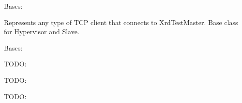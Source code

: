 \documentclass[a4paper,11pt,openany]{sphinxmanual}
\begin{document}
\begin{fulllineitems}
\label{ref-manual/XrdTest:XrdTest.TCPClient.TCPClient}
Bases: {\hyperref[ref-manual/XrdTest:XrdTest.Utils.Stateful]{}}

Represents any type of TCP client that connects to XrdTestMaster. Base
class for Hypervisor and Slave.

\begin{fulllineitems}
\label{ref-manual/XrdTest:XrdTest.TCPClient.TCPClient.S_CONNECTED_IDLE}
\end{fulllineitems}


\begin{fulllineitems}
\label{ref-manual/XrdTest:XrdTest.TCPClient.TCPClient.S_NOT_CONNECTED}
\end{fulllineitems}


\begin{fulllineitems}
\label{ref-manual/XrdTest:XrdTest.TCPClient.TCPClient.send}
\end{fulllineitems}


\end{fulllineitems}


\begin{fulllineitems}
\label{ref-manual/XrdTest:XrdTest.TCPClient.TCPReceiveThread}
Bases: 

TODO:

\begin{fulllineitems}
\label{ref-manual/XrdTest:XrdTest.TCPClient.TCPReceiveThread.close}
TODO:

\end{fulllineitems}


\begin{fulllineitems}
\label{ref-manual/XrdTest:XrdTest.TCPClient.TCPReceiveThread.run}
TODO:

\end{fulllineitems}


\end{fulllineitems}
\end{document}
